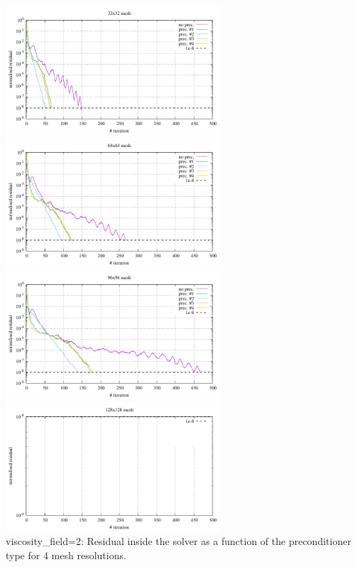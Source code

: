 \begin{center} 
\includegraphics[width=8cm]{python_codes/fieldstone_16/results/visc_field_2/residual_32x32.pdf}
\includegraphics[width=8cm]{python_codes/fieldstone_16/results/visc_field_2/residual_64x64.pdf}\\
\includegraphics[width=8cm]{python_codes/fieldstone_16/results/visc_field_2/residual_96x96.pdf}
\includegraphics[width=8cm]{python_codes/fieldstone_16/results/visc_field_2/residual_128x128.pdf}\\
{\captionfont viscosity\_field=2: Residual inside the solver as a function of the preconditioner type for
4 mesh resolutions.}
\end{center}

